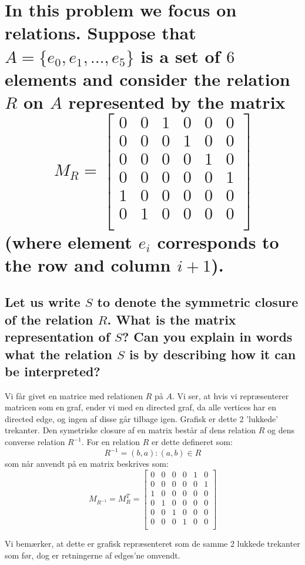 \documentclass[a4paper,12pt]{article}
\begin{document}
\section[Question 4]{In this problem we focus on relations. Suppose that $A = \{e_0,e_1,\dots,e_5\}$ is a set of
$6$ elements and consider the relation $R$ on $A$ represented by the matrix
\[M_R = 
    \begin{bmatrix}
        0 & 0 & 1 & 0 & 0 & 0 \\
        0 & 0 & 0 & 1 & 0 & 0 \\
        0 & 0 & 0 & 0 & 1 & 0 \\
        0 & 0 & 0 & 0 & 0 & 1 \\
        1 & 0 & 0 & 0 & 0 & 0 \\
        0 & 1 & 0 & 0 & 0 & 0 \\
    \end{bmatrix}
\]
(where element $e_i$ corresponds to the row and column $i+1$).}
\subsection[]{Let us write $S$ to denote the symmetric closure of the relation $R$. 
What is the matrix representation of $S$? Can you explain in words what the relation $S$ is by describing how it can be interpreted?
}

Vi får givet en matrice med relationen $R$ på $A$. Vi ser, at hvis vi repræsenterer matricen som en graf, ender vi med en directed graf, da alle vertices har en directed edge, og ingen af disse går tilbage igen. Grafisk er dette 2 'lukkede' trekanter. Den symetriske closure af en matrix består af dens relation $R$ og dens converse relation $R^{-1}$. For en relation $R$ er dette defineret som: 
\[ R^{-1} = (b,a) : (a,b) \in R\]
som når anvendt på en matrix beskrives som:
\[M_{R^{-1}} = M_{R}^T = 
    \begin{bmatrix}
        0 & 0 & 0 & 0 & 1 & 0 \\
        0 & 0 & 0 & 0 & 0 & 1 \\
        1 & 0 & 0 & 0 & 0 & 0 \\
        0 & 1 & 0 & 0 & 0 & 0 \\
        0 & 0 & 1 & 0 & 0 & 0 \\
        0 & 0 & 0 & 1 & 0 & 0 \\
    \end{bmatrix}
\]

Vi bemærker, at dette er grafisk repræsenteret som de samme 2 lukkede trekanter som før, dog er retningerne af edges'ne omvendt.
\end{document}
